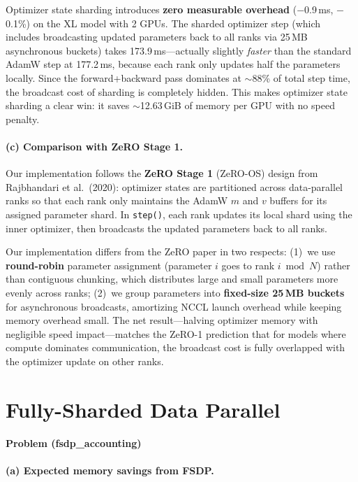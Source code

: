 \documentclass[11pt]{article}
\begin{document}
Optimizer state sharding introduces \textbf{zero measurable overhead}
($-$0.9\,ms, $-$0.1\%) on the XL model with 2 GPUs.
The sharded optimizer step (which includes broadcasting updated
parameters back to all ranks via 25\,MB asynchronous buckets)
takes 173.9\,ms---actually slightly \emph{faster} than the standard
AdamW step at 177.2\,ms, because each rank only updates half the
parameters locally.
Since the forward+backward pass dominates at $\sim$88\% of total step
time, the broadcast cost of sharding is completely hidden.
This makes optimizer state sharding a clear win: it saves $\sim$12.63\,GiB
of memory per GPU with no speed penalty.

\paragraph{(c) Comparison with ZeRO Stage 1.}

Our implementation follows the \textbf{ZeRO Stage 1} (ZeRO-OS) design from
Rajbhandari et al.\ (2020): optimizer states are partitioned across
data-parallel ranks so that each rank only maintains the AdamW
$m$ and $v$ buffers for its assigned parameter shard.
In \texttt{step()}, each rank updates its local shard using the inner
optimizer, then broadcasts the updated parameters back to all ranks.

Our implementation differs from the ZeRO paper in two respects:
(1)~we use \textbf{round-robin} parameter assignment (parameter $i$ goes to
rank $i \bmod N$) rather than contiguous chunking, which distributes
large and small parameters more evenly across ranks;
(2)~we group parameters into \textbf{fixed-size 25\,MB buckets} for
asynchronous broadcasts, amortizing NCCL launch overhead while keeping
memory overhead small.
The net result---halving optimizer memory with negligible speed
impact---matches the ZeRO-1 prediction that for models where compute
dominates communication, the broadcast cost is fully overlapped with
the optimizer update on other ranks.



\section{Fully-Sharded Data Parallel}

\textbf{Problem (fsdp\_accounting)}

\paragraph{(a) Expected memory savings from FSDP.}
\end{document}

